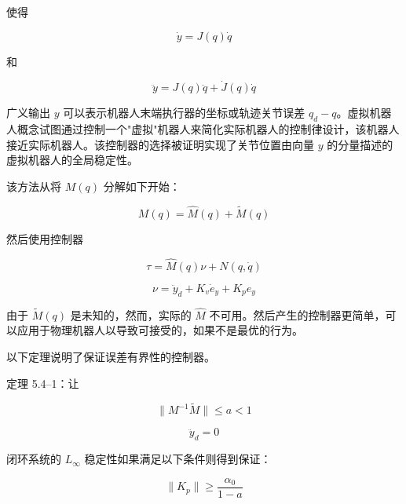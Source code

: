 \documentclass[UTF8,12pt,a4paper]{ctexart}
\begin{document}
使得

\begin{equation}\label{eq:5.4.2}
\dot{y} = J(q)\dot{q}
\end{equation}

和

\begin{equation}\label{eq:5.4.3}
\ddot{y} = J(q)\ddot{q} + \dot{J}(q)\dot{q}
\end{equation}

广义输出 $y$ 可以表示机器人末端执行器的坐标或轨迹关节误差 $q_d - q$。虚拟机器人概念试图通过控制一个"虚拟"机器人来简化实际机器人的控制律设计，该机器人接近实际机器人。该控制器的选择被证明实现了关节位置由向量 $y$ 的分量描述的虚拟机器人的全局稳定性。

该方法从将 $M(q)$ 分解如下开始：

\begin{equation}\label{eq:5.4.4}
M(q) = \hat{M}(q) + \tilde{M}(q)
\end{equation}

然后使用控制器

\begin{equation}\label{eq:5.4.5}
\tau = \hat{M}(q)\nu + N(q, \dot{q})
\end{equation}

\begin{equation}\label{eq:5.4.6}
\nu = \ddot{y}_d + K_v \dot{e}_y + K_p e_y
\end{equation}

由于 $\tilde{M}(q)$ 是未知的，然而，实际的 $\hat{M}$ 不可用。然后产生的控制器更简单，可以应用于物理机器人以导致可接受的，如果不是最优的行为。

以下定理说明了保证误差有界性的控制器。

\begin{theorem}\label{thm:5.4.1}
定理 5.4--1：让

\begin{equation}
\|M^{-1}\tilde{M}\| \leq a < 1
\end{equation}

\begin{equation}
\ddot{y}_d = 0
\end{equation}

闭环系统的 $L_\infty$ 稳定性如果满足以下条件则得到保证：

\begin{equation}
\|K_p\| \geq \frac{\alpha_0}{1 - a}
\end{equation}
\end{theorem}
\end{document}
